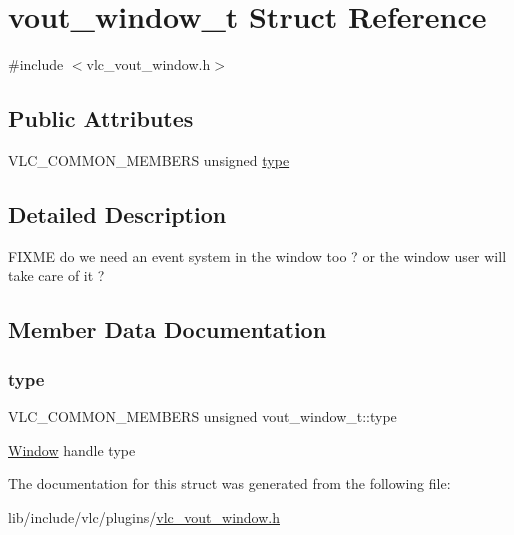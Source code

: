\hypertarget{structvout__window__t}{}\section{vout\+\_\+window\+\_\+t Struct Reference}
\label{structvout__window__t}


{\ttfamily \#include $<$vlc\+\_\+vout\+\_\+window.\+h$>$}

\subsection*{Public Attributes}
\begin{DoxyCompactItemize}
\item 
V\+L\+C\+\_\+\+C\+O\+M\+M\+O\+N\+\_\+\+M\+E\+M\+B\+E\+RS unsigned \hyperlink{structvout__window__t_aa67ac913f2e9f9be6e167293e99048b4}{type}
\end{DoxyCompactItemize}


\subsection{Detailed Description}
F\+I\+X\+ME do we need an event system in the window too ? or the window user will take care of it ? 

\subsection{Member Data Documentation}
\mbox{\label{structvout__window__t_aa67ac913f2e9f9be6e167293e99048b4}} 
\subsubsection{\texorpdfstring{type}{type}}
{\footnotesize\ttfamily V\+L\+C\+\_\+\+C\+O\+M\+M\+O\+N\+\_\+\+M\+E\+M\+B\+E\+RS unsigned vout\+\_\+window\+\_\+t\+::type}

\hyperlink{classWindow}{Window} handle type 

The documentation for this struct was generated from the following file\+:\begin{DoxyCompactItemize}
\item 
lib/include/vlc/plugins/\hyperlink{vlc__vout__window_8h}{vlc\+\_\+vout\+\_\+window.\+h}\end{DoxyCompactItemize}
